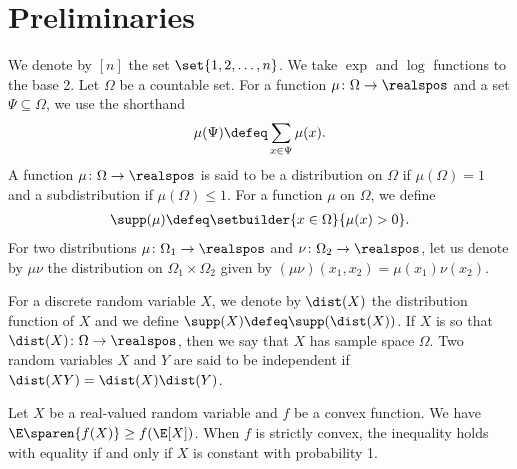 \section{Preliminaries}
\label{sec:preliminaries}

We denote by $[n]$ the set $\set{1,2,\ldots,n}$. We
take $\exp$ and $\log$ functions to the base 2.
Let $\Omega$ be a countable set. 
For a function $\mu\colon\Omega\to\realspos$ and a set 
$\Psi\subseteq\Omega$, we use the shorthand
\begin{align*}
\mu(\Psi) \defeq \sum_{x\in\Psi}\mu(x).
\end{align*}
A function $\mu\colon\Omega\to\realspos$
is said to be a distribution on $\Omega$ if
$\mu(\Omega) = 1$ and a subdistribution
if $\mu(\Omega) \le 1$. For a function
$\mu$ on $\Omega$, we define
\begin{align*}
\supp(\mu)\defeq \setbuilder{x\in \Omega}{\mu(x)>0}.
\end{align*}
For two distributions $\mu\colon\Omega_1\to\realspos$
and $\nu\colon\Omega_2\to\realspos$, let us denote by
$\mu\nu$ the distribution on $\Omega_1\times\Omega_2$
given by $(\mu\nu)(x_1,x_2) = \mu(x_1)\nu(x_2)$.

For a discrete random variable $X$, we denote by
$\dist(X)$ the distribution function of $X$ and
we define $\supp(X)\defeq\supp(\dist(X))$. 
If $X$ is so that $\dist(X)\colon\Omega\to\realspos$,
then we say that $X$ has sample space $\Omega$.
Two 
random variables $X$ and $Y$ are said to be 
independent if $\dist(XY) =\dist(X)\dist(Y)$.

\begin{lemma}
\label{lem:jensen}
Let $X$ be a real-valued random variable and
$f$ be a convex function. We have
$\E\sparen{f(X)} \ge f(\E[X])$. When
$f$ is strictly convex, the inequality holds
with equality if and only if $X$ is constant
with probability 1.
\end{lemma}

